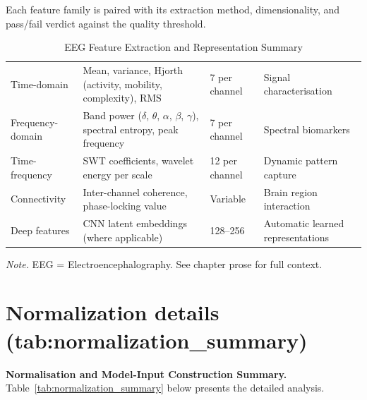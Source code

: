 {\tablestripes\tablefontsize

\noindent Each feature family is paired with its extraction method, dimensionality, and pass/fail verdict against the quality threshold.

\begin{xltabular}{\textwidth}{@{} l L l L @{}}
\caption[EEG Feature Extraction and Representation Summary]{EEG Feature Extraction and Representation Summary}\label{tab:eeg_feature_extraction_summary} \\
\toprule
{} &  &  &  \\
\midrule
\endfirsthead
\endhead
\bottomrule
\endlastfoot
Time-domain & Mean, variance, Hjorth (activity, mobility, complexity), RMS & 7 per channel & Signal characterisation \\
Frequency-domain & Band power ($\delta$, $\theta$, $\alpha$, $\beta$, $\gamma$), spectral entropy, peak frequency & 7 per channel & Spectral biomarkers \\
Time-frequency & SWT coefficients, wavelet energy per scale & 12 per channel & Dynamic pattern capture \\
Connectivity & Inter-channel coherence, phase-locking value & Variable & Brain region interaction \\
Deep features & CNN latent embeddings (where applicable) & 128--256 & Automatic learned representations \\
\end{xltabular}}
\vspace{0.3em}\noindent\textit{Note.} EEG = Electroencephalography. See chapter prose for full context.


\section{Normalization details (tab:normalization\_\allowbreak summary)}
\label{sec:appendix_ch4_tab_normalization_summary}


\noindent\textbf{Normalisation and Model-Input Construction Summary.} Table~\ref{tab:normalization_summary} below presents the detailed analysis.

